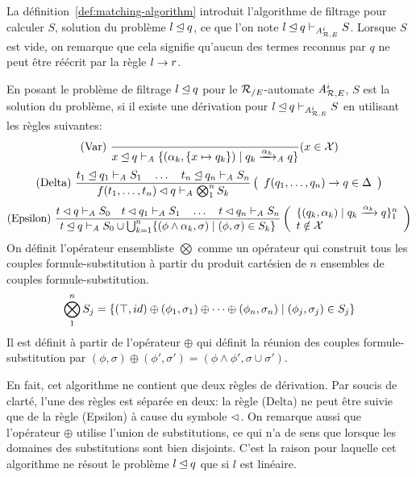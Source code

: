 La définition~\ref{def:matching-algorithm} introduit l'algorithme de filtrage pour calculer $S$, solution du problème $l \unlhd q$,
ce que l'on note $l \unlhd q \vdash_{{\mathit A}_{\mathcal R,E}^i} S$. Lorsque $S$ est vide, on remarque que cela signifie 
qu'aucun des termes reconnus par $q$ ne peut être réécrit par la règle $l \rightarrow r$.


\begin{definition}
  \label{def:matching-algorithm}
  En posant le problème de filtrage $l \unlhd q$ pour le ${\mathcal R_{/E}}$-automate ${\mathit A}_{\mathcal R,E}^i$,
  $S$ est la solution du problème, si il existe une dérivation pour 
  $l \unlhd q \vdash_{{\mathit A}_{\mathcal R,E}^i} S$ en utilisant les règles suivantes:
  {\footnotesize
    \[\textrm{(Var) }
    \dfrac{}
    {x \unlhd q \vdash_\mathit A \{(\alpha_k, \{x \mapsto q_k\}) \; | \; q_k \xrightarrow{\alpha_k}_\mathit A q\}}
    (x \in \mathcal X)
    \]
    \[\textrm{(Delta) }
    \dfrac{
      t_1 \unlhd q_1 \vdash_\mathit A S_1
      \quad \dots \quad
      t_n \unlhd q_n \vdash_\mathit A S_n
    }{f(t_1, \dots, t_n) \lhd q \vdash_\mathit A \bigotimes_1^n S_k
    }\left(
      \begin{array}{l}
        f(q_1, \dots, q_n) \rightarrow q \in \Delta\\
      \end{array}
    \right )
    \]
    \[\textrm{(Epsilon) }
    \dfrac{ 
      t \matchi q    \vdash_\A S_0   \quad
      t \matchi q_1 \vdash_\A S_1 \quad \dots \quad
      t \matchi q_n \vdash_\A S_n
    }{
      t \match q \vdash_\A S_0 \cup
      \bigcup_{k=1}^n \{(\phi \land \alpha_k, \sigma) \sep (\phi, \sigma) \in S_k\}
    }\left(
      \begin{array}{l}
        \{(q_k, \alpha_k) \sep q_k \xrw{\alpha_k} q\}_1^n\\%
        t \notin \X\\
      \end{array}
    \right)
    \]
  }
  On définit l'opérateur ensembliste $\bigotimes$ comme un opérateur qui
  construit tous les couples formule-substitution à partir du produit cartésien
  de $n$ ensembles de couples formule-substitution.
  \[\bigotimes_1^n S_j = \{ (\top, id) \oplus (\phi_1, \sigma_1) \oplus \dots \oplus (\phi_n, \sigma_n) \; | \; (\phi_j,\sigma_j) \in S_j\}\]
  Il est définit à partir de l'opérateur $\oplus$ qui définit la réunion des couples formule-substitution par
  $(\phi, \sigma) \oplus (\phi', \sigma') = (\phi \land \phi',\sigma \cup \sigma')$.
\end{definition}
En fait, cet algorithme ne contient que deux règles de dérivation. Par soucis de clarté, l'une des règles est séparée en deux:
la règle (Delta) ne peut être suivie que de la règle (Epsilon) à cause du symbole $\lhd$. On remarque aussi que l'opérateur $\oplus$
utilise l'union de substitutions, ce qui n'a de sens que lorsque les domaines des substitutions sont bien disjoints. C'est la raison
pour laquelle cet algorithme ne résout le problème $l \unlhd q$ que si $l$ est linéaire.

